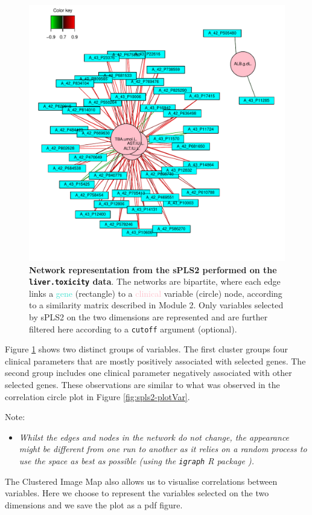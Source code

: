 \documentclass[]{book}
\providecommand{\tightlist}{%
  \setlength{\itemsep}{0pt}\setlength{\parskip}{0pt}}
\begin{document}
\begin{figure}

{\centering \includegraphics[width=0.5\linewidth]{network_liver} 

}

\caption{\textbf{Network representation from the sPLS2 performed on the \texttt{liver.toxicity} data}. The networks are bipartite, where each edge links a \textcolor{turquoise}{gene} (rectangle) to a \textcolor{pink}{clinical} variable (circle) node, according to a similarity matrix described in Module 2. Only variables selected by sPLS2 on the two dimensions are represented and are further filtered here according to a \texttt{cutoff} argument (optional).}\label{fig:spls2-network}
\end{figure}



Figure \ref{fig:spls2-network} shows two distinct groups of variables. The first cluster groups four clinical parameters that are mostly positively associated with selected genes. The second group includes one clinical parameter negatively associated with other selected genes. These observations are similar to what was observed in the correlation circle plot in Figure \ref{fig:spls2-plotVar}.

Note:

\begin{itemize}
\tightlist
\item
  \emph{Whilst the edges and nodes in the network do not change, the appearance might be different from one run to another as it relies on a random process to use the space as best as possible (using the \texttt{igraph} R package \citet{csa06}).}
\end{itemize}

The Clustered Image Map also allows us to visualise correlations between variables. Here we choose to represent the variables selected on the two dimensions and we save the plot as a pdf figure.
\end{document}
